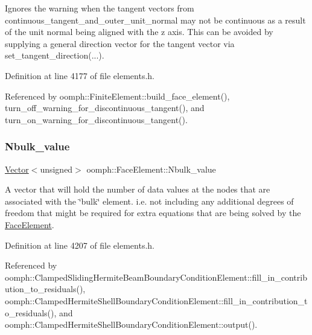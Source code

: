 Ignores the warning when the tangent vectors from continuous\+\_\+tangent\+\_\+and\+\_\+outer\+\_\+unit\+\_\+normal may not be continuous as a result of the unit normal being aligned with the z axis. This can be avoided by supplying a general direction vector for the tangent vector via set\+\_\+tangent\+\_\+direction(...). 



Definition at line 4177 of file elements.\+h.



Referenced by oomph\+::\+Finite\+Element\+::build\+\_\+face\+\_\+element(), turn\+\_\+off\+\_\+warning\+\_\+for\+\_\+discontinuous\+\_\+tangent(), and turn\+\_\+on\+\_\+warning\+\_\+for\+\_\+discontinuous\+\_\+tangent().

\mbox{\label{classoomph_1_1FaceElement_abd04b85066da626341294b5f0b97516e}} 
\subsubsection{\texorpdfstring{Nbulk\+\_\+value}{Nbulk\_value}}
{\footnotesize\ttfamily \hyperlink{classoomph_1_1Vector}{Vector}$<$unsigned$>$ oomph\+::\+Face\+Element\+::\+Nbulk\+\_\+value\hspace{0.3cm}{\ttfamily [protected]}}



A vector that will hold the number of data values at the nodes that are associated with the \char`\"{}bulk\char`\"{} element. i.\+e. not including any additional degrees of freedom that might be required for extra equations that are being solved by the \hyperlink{classoomph_1_1FaceElement}{Face\+Element}. 



Definition at line 4207 of file elements.\+h.



Referenced by oomph\+::\+Clamped\+Sliding\+Hermite\+Beam\+Boundary\+Condition\+Element\+::fill\+\_\+in\+\_\+contribution\+\_\+to\+\_\+residuals(), oomph\+::\+Clamped\+Hermite\+Shell\+Boundary\+Condition\+Element\+::fill\+\_\+in\+\_\+contribution\+\_\+to\+\_\+residuals(), and oomph\+::\+Clamped\+Hermite\+Shell\+Boundary\+Condition\+Element\+::output().

\mbox{\label{classoomph_1_1FaceElement_a5b72b90a01168c323f57714bb9a27376}} 
